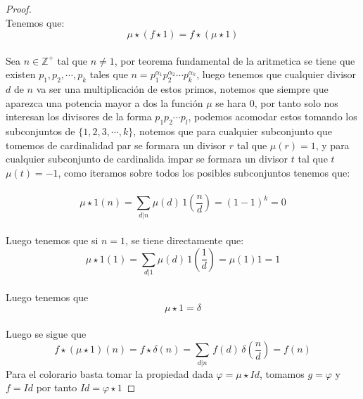 \documentclass[11pt,letterpaper]{article}
\newcommand{\Z}{\mathbb{Z}}
\begin{document}
\begin{proof}\,\\
    Tenemos que:\,\\
    \begin{equation*}
        \mu \star (f\star 1)=f\star(\mu \star 1)
    \end{equation*}\,\\
    Sea $n\in \Z^+$ tal que $n\neq 1$, por teorema fundamental de la aritmetica se tiene que existen $p_1,p_2,\cdots,p_k$ tales que
    $n=p_1^{\alpha_1}p_2^{\alpha_2}\cdots p_k^{\alpha_k}$, luego tenemos que cualquier divisor $d$ de $n$ va ser una multiplicaci\'on de estos primos, notemos que siempre
    que aparezca una potencia mayor a dos la funci\'on $\mu$ se hara $0$, por tanto solo nos interesan los divisores de la forma $p_1p_2\cdots p_l$, podemos acomodar estos 
    tomando los subconjuntos de $\{1,2,3,\cdots,k\}$, notemos que para cualquier subconjunto que tomemos de cardinalidad par se formara un divisor $r$ tal que $\mu(r)=1$, y para cualquier subconjunto de cardinalida impar
    se formara un divisor $t$ tal que $t$ $\mu(t)=-1$, como iteramos sobre todos los posibles subconjuntos tenemos que:\,\\
    \,\\
    \begin{equation*}
        \mu\star1(n)=\sum_{d|n}\mu(d)\,1\left(\frac{n}{d}\right)=(1-1)^k=0
    \end{equation*}\,\\
    Luego tenemos que si $n=1$, se tiene directamente que:\,\\
        \begin{equation*}
        \mu\star1(1)=\sum_{d|1}\mu(d)\,1\left(\frac{1}{d}\right)=\mu(1)1=1
    \end{equation*}\,\\
    Luego tenemos que\,\\
    \begin{equation*}
        \mu\star1=\delta
    \end{equation*}\,\\
    Luego se sigue que\,\\
    \begin{equation*}
        f\star(\mu\star 1)(n)=f\star\delta(n)=\sum_{d|n}\,f(d)\,\delta\left(\frac{n}{d}\right)=f(n)
    \end{equation*}
    Para el colorario basta tomar la propiedad dada $\varphi=\mu\star Id$, tomamos $g=\varphi$ y $f=Id$ por tanto $Id=\varphi\star 1$
\end{proof}
\end{document}
